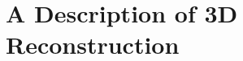 \documentclass{beamer}
\begin{document}



\section{A Description of 3D Reconstruction} %
\end{document}
